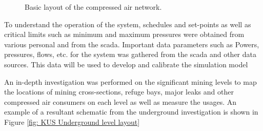 	\begin{figure}[h!]
		\centering
		\caption{Basic layout of the compressed air network.}
		\label{fig: KUS Air layout}
	\end{figure}
 To understand the operation of the system, schedules and set-points as well as critical limits such as minimum and maximum pressures were obtained from various personal and from the \gls{scada}. Important data parameters such as Powers, pressures, flows, etc. for the system was gathered from the \gls{scada} and other data sources. This data will be used to develop and calibrate the simulation model
\par 
		
	An in-depth investigation was performed on the significant mining levels to map the locations of mining cross-sections, refuge bays, major leaks and other compressed air consumers on each level as well as measure the usages. An example of a resultant schematic from the underground investigation is shown in Figure \ref{fig: KUS Underground level layout}
	
